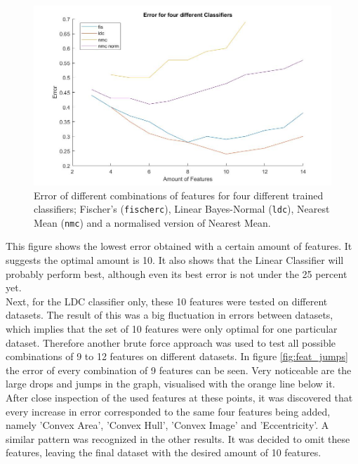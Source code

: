 \begin{figure}[H]
	\centering
	\includegraphics[scale=0.45]{images/feat_bf_error.jpg}
	\caption{Error of different combinations of features for four different trained classifiers; Fischer's (\texttt{fischerc}), Linear Bayes-Normal (\texttt{ldc}), Nearest Mean (\texttt{nmc}) and a normalised version of Nearest Mean.}
	\label{fig:feat_bf_error}
\end{figure}
\noindent This figure shows the lowest error obtained with a certain amount of features. It suggests the optimal amount is 10. It also shows that the Linear Classifier will probably perform best, although even its best error is not under the 25 percent yet. \\
Next, for the LDC classifier only, these 10 features were tested on different datasets. The result of this was a big fluctuation in errors between datasets, which implies that the set of 10 features were only optimal for one particular dataset. Therefore another brute force approach was used to test all possible combinations of 9 to 12 features on different datasets. In figure \ref{fig:feat_jumps} the error of every combination of 9 features can be seen. Very noticeable are the large drops and jumps in the graph, visualised with the orange line below it. After close inspection of the used features at these points, it was discovered that every increase in error corresponded to the same four features being added, namely 'Convex Area', 'Convex Hull', 'Convex Image' and 'Eccentricity'. A similar pattern was recognized in the other results. It was decided to omit these features, leaving the final dataset with the desired amount of 10 features.
